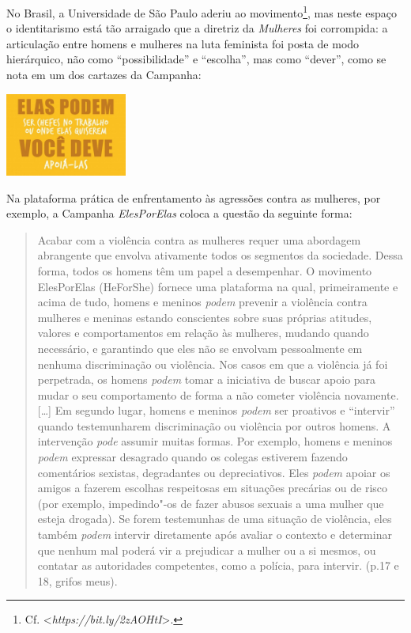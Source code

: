 No Brasil, a Universidade de São Paulo aderiu ao movimento\footnote{Cf.
  \textless{}\emph{https://bit.ly/2zAOHtI}\textgreater{}.},
mas neste espaço o identitarismo está tão arraigado que a diretriz da
\emph{ Mulheres} foi corrompida: a articulação entre homens e
mulheres na luta feminista foi posta de modo hierárquico, não como
``possibilidade'' e ``escolha'', mas como ``dever'', como se nota em um
dos cartazes da Campanha:

\begin{center}
\includegraphics[width=4cm]{./imgs/img1.png}
\end{center}

Na plataforma prática de enfrentamento às agressões contra as mulheres,
por exemplo, a Campanha \emph{ElesPorElas} coloca a questão da seguinte
forma:

\begin{quote}
Acabar com a violência contra as mulheres requer uma abordagem
abrangente que envolva ativamente todos os segmentos da sociedade. Dessa
forma, todos os homens têm um papel a desempenhar. O movimento
ElesPorElas (HeForShe) fornece uma plataforma na qual, primeiramente e
acima de tudo, homens e meninos \emph{podem} prevenir a violência
contra mulheres e meninas estando conscientes sobre suas próprias
atitudes, valores e comportamentos em relação às mulheres, mudando
quando necessário, e garantindo que eles não se envolvam pessoalmente em
nenhuma discriminação ou violência. Nos casos em que a violência já foi
perpetrada, os homens \emph{podem} tomar a iniciativa de buscar apoio
para mudar o seu comportamento de forma a não cometer violência
novamente. {[}\ldots{}{]} Em segundo lugar, homens e meninos \emph{podem}
ser proativos e ``intervir'' quando testemunharem discriminação ou
violência por outros homens. A intervenção \emph{pode} assumir muitas
formas. Por exemplo, homens e meninos \emph{podem} expressar desagrado
quando os colegas estiverem fazendo comentários sexistas, degradantes ou
depreciativos. Eles \emph{podem} apoiar os amigos a fazerem escolhas
respeitosas em situações precárias ou de risco (por exemplo,
impedindo"-os de fazer abusos sexuais a uma mulher que esteja drogada).
Se forem testemunhas de uma situação de violência, eles também
\emph{podem} intervir diretamente após avaliar o contexto e determinar
que nenhum mal poderá vir a prejudicar a mulher ou a si mesmos, ou
contatar as autoridades competentes, como a polícia, para intervir.
(p.17 e 18, grifos meus).
\end{quote}

